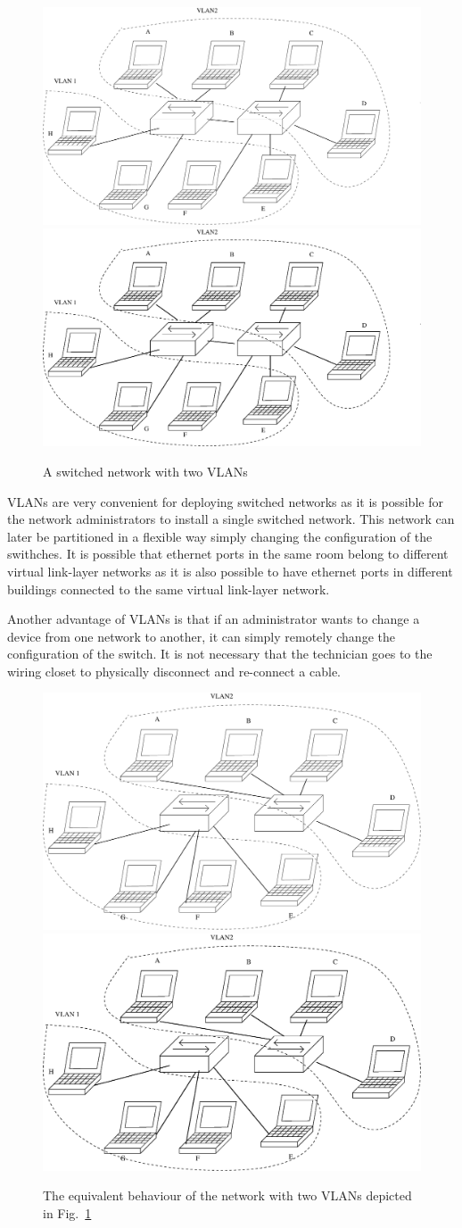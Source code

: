 \begin{figure}
\centering
\ifpdf
\includegraphics[width=0.5\linewidth]{Figures/Vlan.pdf}
\else
\includegraphics[width=0.5\linewidth]{Figures/Vlan.eps}
\fi
\caption{A switched network with two VLANs}
\label{fig:Vlan}
\end{figure}

VLANs are very convenient for deploying switched networks as it is possible for the network administrators to install a single switched network.
This network can later be partitioned in a flexible way simply changing the configuration of the swithches.
It is possible that ethernet ports in the same room belong to different virtual link-layer networks as it is also possible to have ethernet ports in different buildings connected to the same virtual link-layer network.

Another advantage of VLANs is that if an administrator wants to change a device from one network to another, it can simply remotely change the configuration of the switch.
It is not necessary that the technician goes to the wiring closet to physically disconnect and re-connect a cable.

\begin{figure}
\centering
\ifpdf
\includegraphics[width=0.5\linewidth]{Figures/Equivalent.pdf}
\else
\includegraphics[width=0.5\linewidth]{Figures/Equivalent.eps}
\fi
\caption{The equivalent behaviour of the network with two VLANs depicted in Fig.~\ref{fig:Vlan}}
\label{fig:Equivalent}
\end{figure}

